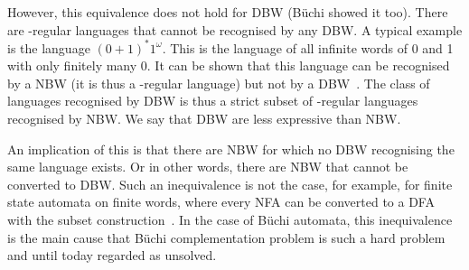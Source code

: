 However, this equivalence does not hold for DBW (Büchi showed it too). There are \om-regular languages that cannot be recognised by any DBW. A typical example is the language $(0+1)^*1^\omega$. This is the language of all infinite words of 0 and 1 with only finitely many 0. It can be shown that this language can be recognised by a NBW (it is thus a \om-regular language) but not by a DBW~\cite{1996_vardi}\cite{2002_roggenbach}. The class of languages recognised by DBW is thus a strict subset of \om-regular languages recognised by NBW. We say that DBW are less expressive than NBW.

An implication of this is that there are NBW for which no DBW recognising the same language exists. Or in other words, there are NBW that cannot be converted to DBW. Such an inequivalence is not the case, for example, for finite state automata on finite words, where every NFA can be converted to a DFA with the subset construction~\cite{hopcroft2006automata}\cite{1959_rabin}. In the case of Büchi automata, this inequivalence is the main cause that Büchi complementation problem is such a hard problem~\cite{niessner1997deterministic} and until today regarded as unsolved. 





